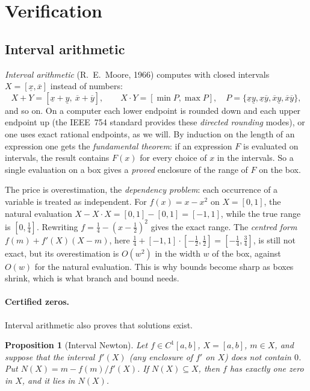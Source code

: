 \documentclass[11pt,openany]{book}
\theoremstyle{plain}
\newtheorem{proposition}[theorem]{Proposition}
\theoremstyle{definition}
\theoremstyle{remark}
\begin{document}
\section{Verification}
\label{COMP:sec:verify}

\subsection{Interval arithmetic}
\emph{Interval arithmetic} (R.~E.~Moore, 1966) computes with closed intervals $X=[\underline x,\overline x]$
instead of numbers:
\[
  X+Y=[\underline x+\underline y,\ \overline x+\overline y],\qquad
  X\cdot Y=[\min P,\max P],\quad P=\{\underline x\underline y,\underline x\overline y,\overline x\underline y,\overline x\overline y\},
\]
and so on. On a computer each lower endpoint is rounded down and each upper endpoint up (the IEEE~754
standard provides these \emph{directed rounding} modes), or one uses exact rational endpoints, as we will.
By induction on the length of an expression one gets the \emph{fundamental theorem}: if an expression $F$ is
evaluated on intervals, the result contains $F(x)$ for every choice of $x$ in the intervals. So a single
evaluation on a box gives a \emph{proved} enclosure of the range of $F$ on the box.

The price is overestimation, the \emph{dependency problem}: each occurrence of a variable is treated as
independent. For $f(x)=x-x^2$ on $X=[0,1]$, the natural evaluation $X-X\cdot X=[0,1]-[0,1]=[-1,1]$, while the
true range is $[0,\frac14]$. Rewriting $f=\frac14-(x-\frac12)^2$ gives the exact range. The \emph{centred
form} $f(m)+f'(X)(X-m)$, here $\frac14+[-1,1]\cdot[-\frac12,\frac12]=[-\frac14,\frac34]$, is still not exact,
but its overestimation is $O(w^2)$ in the width $w$ of the box, against $O(w)$ for the natural evaluation.
This is why bounds become sharp as boxes shrink, which is what branch and bound needs.

\paragraph{Certified zeros.} Interval arithmetic also proves that solutions exist.

\begin{proposition}[Interval Newton]\label{COMP:prop:newton}
Let $f\in C^1[a,b]$, $X=[a,b]$, $m\in X$, and suppose that the interval $f'(X)$ (any enclosure of $f'$ on
$X$) does not contain $0$. Put $N(X)=m-f(m)/f'(X)$. If $N(X)\subseteq X$, then $f$ has exactly one zero in $X$,
and it lies in $N(X)$.
\end{proposition}
\end{document}
